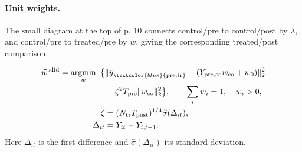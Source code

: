 \paragraph{Unit weights.}
The small diagram at the top of p. 10 connects control/pre to control/post by \(\lambda\), and control/pre to treated/pre by \(w\), giving the corresponding treated/post comparison.
\begin{center}
\end{center}
\begin{align*}
\widehat w^{\mathrm{sdid}}
=\operatorname*{argmin}_{w}\ \big\{
&\|\overline y_{\textcolor{blue}{\mathrm{pre,tr}}}
-(Y_{\mathrm{pre,co}}w_{\mathrm{co}}+w_0)\|_2^2\\
&+\zeta^2T_{\mathrm{pre}}\|w_{\mathrm{co}}\|_2^2\big\},
\qquad \sum_iw_i=1,\quad w_i>0,\\
\zeta&=(N_{\mathrm{tr}}T_{\mathrm{post}})^{1/4}
\widehat\sigma(\Delta_{it}),\\
\Delta_{it}&=Y_{it}-Y_{i,t-1}.
\end{align*}
Here \(\Delta_{it}\) is the first difference and \(\widehat\sigma(\Delta_{it})\) its standard deviation.

